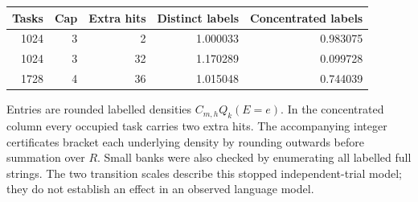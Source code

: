 \begin{center}
\begin{tabular}{rrrrr}
\toprule
Tasks & Cap & Extra hits & Distinct labels & Concentrated labels\\
\midrule
1024 & 3 & 2 & 1.000033 & 0.983075\\
1024 & 3 & 32 & 1.170289 & 0.099728\\
1728 & 4 & 36 & 1.015048 & 0.744039\\
\bottomrule
\end{tabular}
\end{center}
Entries are rounded labelled densities $C_{m,h}Q_k(E=e)$. In the concentrated column every occupied task carries two extra hits. The accompanying integer certificates bracket each underlying density by rounding outwards before summation over $R$. Small banks were also checked by enumerating all labelled full strings. The two transition scales describe this stopped independent-trial model; they do not establish an effect in an observed language model.
